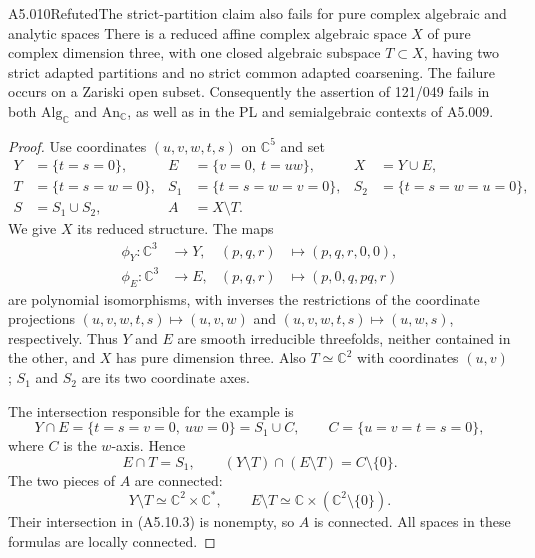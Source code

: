 \begin{saresult}{A5.010}{Refuted}{The strict-partition claim also fails for pure complex algebraic and analytic spaces}
There is a reduced affine complex algebraic space $X$ of pure
complex dimension three, with one closed algebraic subspace
$T\subset X$, having two strict adapted partitions and no strict
common adapted coarsening.  The failure occurs on a Zariski open
subset.  Consequently the assertion of 121/049 fails in both
$\mathrm{Alg}_{\mathbb C}$ and $\mathrm{An}_{\mathbb C}$, as well
as in the PL and semialgebraic contexts of A5.009.
\end{saresult}
\begin{proof}
Use coordinates $(u,v,w,t,s)$ on $\mathbb C^5$ and set
\[
\begin{aligned}
 Y&=\{t=s=0\},&
 E&=\{v=0,\ t=uw\},& X&=Y\cup E,\\
 T&=\{t=s=w=0\},&
 S_1&=\{t=s=w=v=0\},&
 S_2&=\{t=s=w=u=0\},\\
 S&=S_1\cup S_2,& A&=X\setminus T.
\end{aligned}                                                    \tag{A5.10.1}
\]
We give $X$ its reduced structure.  The maps
\[
\begin{aligned}
 \phi_Y:\mathbb C^3&\longrightarrow Y,&
 (p,q,r)&\longmapsto(p,q,r,0,0),\\
 \phi_E:\mathbb C^3&\longrightarrow E,&
 (p,q,r)&\longmapsto(p,0,q,pq,r)
\end{aligned}
\]
are polynomial isomorphisms, with inverses the restrictions of the
coordinate projections $(u,v,w,t,s)\mapsto(u,v,w)$ and
$(u,v,w,t,s)\mapsto(u,w,s)$, respectively.  Thus $Y$ and $E$ are
smooth irreducible threefolds, neither contained in the other, and
$X$ has pure dimension three.  Also $T\simeq\mathbb C^2$ with
coordinates $(u,v)$; $S_1$ and $S_2$ are its two coordinate axes.

The intersection responsible for the example is
\[
 Y\cap E=\{t=s=v=0,\ uw=0\}=S_1\cup C,
 \qquad C=\{u=v=t=s=0\},                         \tag{A5.10.2}
\]
where $C$ is the $w$-axis.  Hence
\[
 E\cap T=S_1,\qquad
 (Y\setminus T)\cap(E\setminus T)=C\setminus\{0\}.
                                                               \tag{A5.10.3}
\]
The two pieces of $A$ are connected:
\[
 Y\setminus T\simeq\mathbb C^2\times\mathbb C^*,
 \qquad E\setminus T\simeq
       \mathbb C\times(\mathbb C^2\setminus\{0\}).
\]
Their intersection in (A5.10.3) is nonempty, so $A$ is connected.
All spaces in these formulas are locally connected.


\end{proof}
